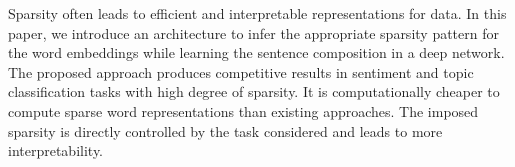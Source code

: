 Sparsity often leads to efficient and interpretable representations for data. In this paper, we introduce an architecture to infer the appropriate sparsity pattern for the word embeddings while learning the sentence composition in a deep network. The proposed approach produces competitive results in sentiment and topic classification tasks with high degree of sparsity. It is computationally cheaper to compute sparse word representations than existing approaches. The imposed sparsity is directly controlled by the task considered and leads to more interpretability.
